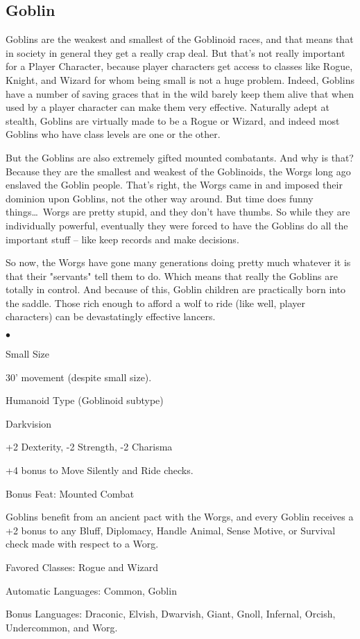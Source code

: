 \subsection{Goblin}
\vspace*{-8pt}

Goblins are the weakest and smallest of the Goblinoid races, and that means that in society in general they get a really crap deal. But that's not really important for a Player Character, because player characters get access to classes like Rogue, Knight, and Wizard for whom being small is not a huge problem. Indeed, Goblins have a number of saving graces that in the wild barely keep them alive that when used by a player character can make them very effective. Naturally adept at stealth, Goblins are virtually made to be a Rogue or Wizard, and indeed most Goblins who have class levels are one or the other.

But the Goblins are also extremely gifted mounted combatants. And why is that? Because they are the smallest and weakest of the Goblinoids, the Worgs long ago enslaved the Goblin people. That's right, the Worgs came in and imposed their dominion upon Goblins, not the other way around. But time does funny things\ldots\ Worgs are pretty stupid, and they don't have thumbs. So while they are individually powerful, eventually they were forced to have the Goblins do all the important stuff -- like keep records and make decisions.

So now, the Worgs have gone many generations doing pretty much whatever it is that their "servants" tell them to do. Which means that really the Goblins are totally in control. And because of this, Goblin children are practically born into the saddle. Those rich enough to afford a wolf to ride (like well, player characters) can be devastatingly effective lancers.

\begin{list}{$\bullet$}{\itemspace}
    \item Small Size
    \item 30' movement (despite small size).
    \item Humanoid Type (Goblinoid subtype)
    \item Darkvision
    \item +2 Dexterity, -2 Strength, -2 Charisma
    \item +4 bonus to Move Silently and Ride checks.
    \item Bonus Feat: Mounted Combat
    \item Goblins benefit from an ancient pact with the Worgs, and every Goblin receives a +2 bonus to any Bluff, Diplomacy, Handle Animal, Sense Motive, or Survival check made with respect to a Worg.
    \item Favored Classes: Rogue and Wizard
    \item Automatic Languages: Common, Goblin
    \item Bonus Languages: Draconic, Elvish, Dwarvish, Giant, Gnoll, Infernal, Orcish, Undercommon, and Worg.
\end{list}

